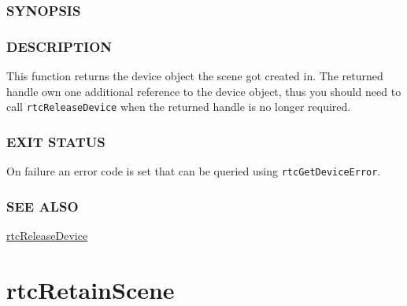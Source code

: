 \begin{Shaded}
\begin{Highlighting}[]
\OperatorTok{{-}}
\end{Highlighting}
\end{Shaded}

\subsubsection{SYNOPSIS}\label{synopsis}

\begin{Shaded}
\begin{Highlighting}[]

\OperatorTok{(}\OperatorTok{);}
\end{Highlighting}
\end{Shaded}

\subsubsection{DESCRIPTION}\label{description}

This function returns the device object the scene got created in. The
returned handle own one additional reference to the device object, thus
you should need to call \texttt{rtcReleaseDevice} when the returned
handle is no longer required.

\subsubsection{EXIT STATUS}\label{exit-status}

On failure an error code is set that can be queried using
\texttt{rtcGetDeviceError}.

\subsubsection{SEE ALSO}\label{see-also}

\hyperref[rtcreleasedevice]{rtcReleaseDevice}

\pagebreak

\section{rtcRetainScene}\label{rtcretainscene}

